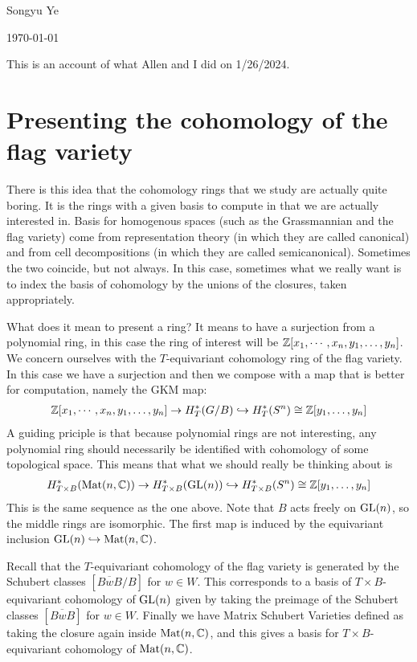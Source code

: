 \documentclass[12pt]{article}
\begin{document}
Songyu Ye

\today

\hfill

This is an account of what Allen and I did on 1/26/2024.
\section{Presenting the cohomology of the flag variety}
There is this idea that the cohomology rings that we study are actually quite boring. It is the
rings with a given basis to compute in that we are actually interested in. Basis for homogenous spaces (such
as the Grassmannian and the flag variety) come from representation theory (in which they are called canonical)
and from cell decompositions (in which they are called semicanonical). Sometimes the two coincide, but not always.
In this case, sometimes what we really want is to index the basis of cohomology by the unions of the closures, taken appropriately.

\hfill

What does it mean to present a ring? It means to have a surjection from a polynomial ring, in this case the ring of interest will be
$\mathbb{Z}[x_1, \cdots, x_n,y_1,\dots,y_n]$. We concern ourselves with the $T$-equivariant cohomology ring of the flag variety. In this case
we have a surjection and then we compose with a map that is better for computation, namely the GKM map:
\begin{align*}
	\mathbb{Z}[x_1, \cdots, x_n, y_1,\dots,y_n] & \to H_T^*(G/B) \hookrightarrow H_T^*(S^n) \cong \mathbb{Z}[y_1,\dots,y_n] \\
\end{align*}
A guiding priciple is that because polynomial rings are not interesting, any polynomial ring should
necessarily be identified with cohomology of some topological space. This means that what we should really be thinking about is
\begin{align*}
	H_{T\times B}^*(\operatorname{Mat}(n,\mathbb{C}))\to H_{T\times B}^*(\operatorname{GL}(n)) \hookrightarrow H_{T\times B}^*(S^n) \cong \mathbb{Z}[y_1,\dots,y_n] \\
\end{align*} This is the same sequence as the one above. Note that $B$ acts freely on $\operatorname{GL}(n)$, so the middle rings are isomorphic. The first map
is induced by the equivariant inclusion $\operatorname{GL}(n) \hookrightarrow \operatorname{Mat}(n,\mathbb{C})$.

\hfill

Recall that the $T$-equivariant cohomology of the flag variety is generated by the Schubert classes $[\overline{BwB}/B]$ for $w\in W$.
This corresponds to a basis of $T\times B$-equivariant cohomology of $\operatorname{GL}(n)$ given by taking the preimage of the Schubert classes $[\overline{BwB}]$ for $w\in W$.
Finally we have Matrix Schubert Varieties defined as taking the closure again inside $\operatorname{Mat}(n,\mathbb{C})$, and this gives a basis for $T\times B$-equivariant cohomology of $\operatorname{Mat}(n,\mathbb{C})$.
\end{document}
